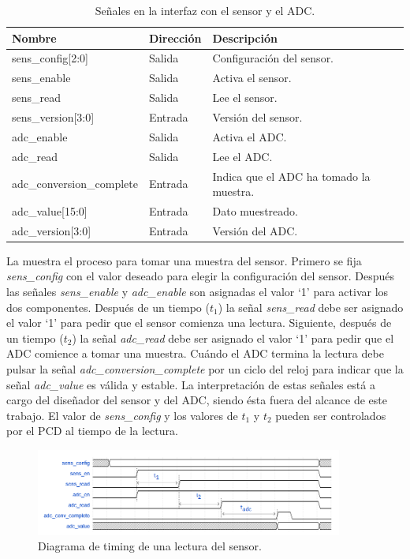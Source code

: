 \documentclass[a4paper, twoside, 11pt]{report}
\begin{document}
\begin{table}[htb]
  \centering
  \tablezebra
  \begin{tabulary}{\linewidth}{l|l|L}
    \setcounter{rownum}{0}
    \textbf{Nombre}&\textbf{Dirección}&\textbf{Descripción} \\
    \hline
    sens\_config[2:0]&Salida&Configuración del sensor. \\
    sens\_enable&Salida&Activa el sensor. \\
    sens\_read&Salida&Lee el sensor. \\
    sens\_version[3:0]&Entrada&Versión del sensor. \\
    adc\_enable&Salida&Activa el ADC. \\
    adc\_read&Salida&Lee el ADC. \\
    adc\_conversion\_complete&Entrada&Indica que el ADC ha tomado la muestra. \\
    adc\_value[15:0]&Entrada&Dato muestreado. \\
    adc\_version[3:0]&Entrada&Versión del ADC. \\
  \end{tabulary}
  \caption{Señales en la interfaz con el sensor y el ADC.}
  \label{tab:sens_adc_signals}
\end{table}

La  muestra el proceso para tomar una muestra del sensor. Primero se fija \textit{sens\_config} con el valor deseado para elegir la configuración del sensor. Después las señales \textit{sens\_enable} y \textit{adc\_enable} son asignadas el valor ‘1’ para activar los dos componentes. Después de un tiempo ($t_1$) la señal \textit{sens\_read} debe ser asignado el valor ‘1’ para pedir que el sensor comienza una lectura. Siguiente, después de un tiempo ($t_2$) la señal \textit{adc\_read} debe ser asignado el valor ‘1’ para pedir que el ADC comience a tomar una muestra. Cuándo el ADC termina la lectura debe pulsar la señal \textit{adc\_conversion\_complete} por un ciclo del reloj para indicar que la señal \textit{adc\_value} es válida y estable. La interpretación de estas señales está a cargo del diseñador del sensor y del ADC, siendo ésta fuera del alcance de este trabajo. El valor de \textit{sens\_config} y los valores de $t_1$ y $t_2$ pueden ser controlados por el PCD al tiempo de la lectura.

\begin{figure}[htb]
  \centering
  \includegraphics[width=0.9\textwidth]{./img/sens_adc}
  \caption{Diagrama de timing de una lectura del sensor.}
  \label{fig:sens_adc}
\end{figure}
\end{document}

